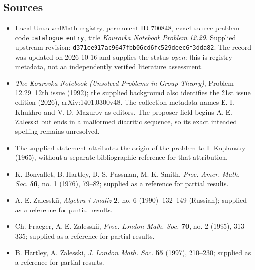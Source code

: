 \documentclass[11pt]{article}
\begin{document}
\subsection{Sources}
\begin{itemize}
\item Local UnsolvedMath registry, permanent ID \(700848\), exact source problem code \texttt{catalogue entry}, title \emph{Kourovka Notebook Problem 12.29}. Supplied upstream revision: \texttt{d371ee917ac9647fbb06cd6fc529deec6f3dda82}. The record was updated on 2026-10-16 and supplies the status \emph{open}; this is registry metadata, not an independently verified literature assessment.
\item \emph{The Kourovka Notebook (Unsolved Problems in Group Theory)}, Problem 12.29, 12th issue (1992); the supplied background also identifies the 21st issue edition (2026), arXiv:1401.0300v48. The collection metadata names E. I. Khukhro and V. D. Mazurov as editors. The proposer field begins A. E. Zalesski but ends in a malformed diacritic sequence, so its exact intended spelling remains unresolved.
\item The supplied statement attributes the origin of the problem to I. Kaplansky (1965), without a separate bibliographic reference for that attribution.
\item K. Bonvallet, B. Hartley, D. S. Passman, M. K. Smith, \emph{Proc. Amer. Math. Soc.} \textbf{56}, no. 1 (1976), 79--82; supplied as a reference for partial results.
\item A. E. Zalesskiĭ, \emph{Algebra i Analiz} \textbf{2}, no. 6 (1990), 132--149 (Russian); supplied as a reference for partial results.
\item Ch. Praeger, A. E. Zalesskii, \emph{Proc. London Math. Soc.} \textbf{70}, no. 2 (1995), 313--335; supplied as a reference for partial results.
\item B. Hartley, A. Zalesski, \emph{J. London Math. Soc.} \textbf{55} (1997), 210--230; supplied as a reference for partial results.
\end{itemize}
\end{document}
